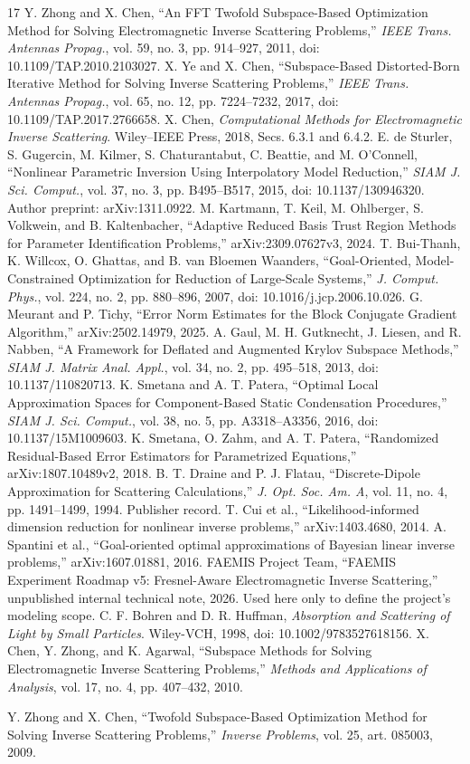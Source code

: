 \begin{thebibliography}{17}
 Y. Zhong and X. Chen, ``An FFT Twofold Subspace-Based Optimization Method for Solving Electromagnetic Inverse Scattering Problems,'' \emph{IEEE Trans. Antennas Propag.}, vol. 59, no. 3, pp. 914--927, 2011, doi: 10.1109/TAP.2010.2103027.
 X. Ye and X. Chen, ``Subspace-Based Distorted-Born Iterative Method for Solving Inverse Scattering Problems,'' \emph{IEEE Trans. Antennas Propag.}, vol. 65, no. 12, pp. 7224--7232, 2017, doi: 10.1109/TAP.2017.2766658.
 X. Chen, \emph{Computational Methods for Electromagnetic Inverse Scattering}. Wiley--IEEE Press, 2018, Secs. 6.3.1 and 6.4.2.
 E. de Sturler, S. Gugercin, M. Kilmer, S. Chaturantabut, C. Beattie, and M. O'Connell, ``Nonlinear Parametric Inversion Using Interpolatory Model Reduction,'' \emph{SIAM J. Sci. Comput.}, vol. 37, no. 3, pp. B495--B517, 2015, doi: 10.1137/130946320. Author preprint: arXiv:1311.0922.
 M. Kartmann, T. Keil, M. Ohlberger, S. Volkwein, and B. Kaltenbacher, ``Adaptive Reduced Basis Trust Region Methods for Parameter Identification Problems,'' arXiv:2309.07627v3, 2024.
 T. Bui-Thanh, K. Willcox, O. Ghattas, and B. van Bloemen Waanders, ``Goal-Oriented, Model-Constrained Optimization for Reduction of Large-Scale Systems,'' \emph{J. Comput. Phys.}, vol. 224, no. 2, pp. 880--896, 2007, doi: 10.1016/j.jcp.2006.10.026.
 G. Meurant and P. Tichy, ``Error Norm Estimates for the Block Conjugate Gradient Algorithm,'' arXiv:2502.14979, 2025.
 A. Gaul, M. H. Gutknecht, J. Liesen, and R. Nabben, ``A Framework for Deflated and Augmented Krylov Subspace Methods,'' \emph{SIAM J. Matrix Anal. Appl.}, vol. 34, no. 2, pp. 495--518, 2013, doi: 10.1137/110820713.
 K. Smetana and A. T. Patera, ``Optimal Local Approximation Spaces for Component-Based Static Condensation Procedures,'' \emph{SIAM J. Sci. Comput.}, vol. 38, no. 5, pp. A3318--A3356, 2016, doi: 10.1137/15M1009603.
 K. Smetana, O. Zahm, and A. T. Patera, ``Randomized Residual-Based Error Estimators for Parametrized Equations,'' arXiv:1807.10489v2, 2018.
 B. T. Draine and P. J. Flatau, ``Discrete-Dipole Approximation for Scattering Calculations,'' \emph{J. Opt. Soc. Am. A}, vol. 11, no. 4, pp. 1491--1499, 1994. Publisher record.
 T. Cui et al., ``Likelihood-informed dimension reduction for nonlinear inverse problems,'' arXiv:1403.4680, 2014.
 A. Spantini et al., ``Goal-oriented optimal approximations of Bayesian linear inverse problems,'' arXiv:1607.01881, 2016.
 FAEMIS Project Team, ``FAEMIS Experiment Roadmap v5: Fresnel-Aware Electromagnetic Inverse Scattering,'' unpublished internal technical note, 2026. Used here only to define the project's modeling scope.
 C. F. Bohren and D. R. Huffman, \emph{Absorption and Scattering of Light by Small Particles}. Wiley-VCH, 1998, doi: 10.1002/9783527618156.
 X. Chen, Y. Zhong, and K. Agarwal, ``Subspace Methods for Solving Electromagnetic Inverse Scattering Problems,'' \emph{Methods and Applications of Analysis}, vol. 17, no. 4, pp. 407--432, 2010.

 Y. Zhong and X. Chen, ``Twofold Subspace-Based Optimization Method for Solving Inverse Scattering Problems,'' \emph{Inverse Problems}, vol. 25, art. 085003, 2009.
\end{thebibliography}